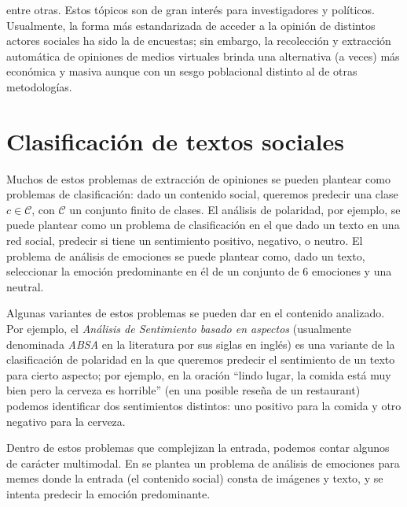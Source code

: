 entre otras. Estos tópicos son de gran interés para investigadores y políticos. Usualmente, la forma más estandarizada de acceder a la opinión de distintos actores sociales ha sido la de encuestas; sin embargo, la recolección y extracción automática de opiniones de medios virtuales brinda una alternativa (a veces) más económica y masiva aunque con un sesgo poblacional distinto al de otras metodologías.


\section{Clasificación de textos sociales}

Muchos de estos problemas de extracción de opiniones se pueden plantear como problemas de clasificación\cite{pang2008opinion}: dado un contenido social, queremos predecir una clase $c \in \mathcal{C}$, con $\mathcal{C}$ un conjunto finito de clases. El análisis de polaridad, por ejemplo, se puede plantear como un problema de clasificación en el que dado un texto en una red social, predecir si tiene un sentimiento positivo, negativo, o neutro. El problema de análisis de emociones se puede plantear como, dado un texto, seleccionar la emoción predominante en él de un conjunto de 6 emociones y una neutral.

Algunas variantes de estos problemas se pueden dar en el contenido analizado. Por ejemplo, el \emph{Análisis de Sentimiento basado en aspectos} (usualmente denominada \emph{ABSA} en la literatura por sus siglas en inglés) es una variante de la clasificación de polaridad en la que queremos predecir el sentimiento de un texto para cierto aspecto\cite{pavlopoulos2014aspect}; por ejemplo, en la oración ``lindo lugar, la comida está muy bien pero la cerveza es horrible'' (en una posible reseña de un restaurant) podemos identificar dos sentimientos distintos: uno positivo para la comida y otro negativo para la cerveza.

Dentro de estos problemas que complejizan la entrada, podemos contar algunos de carácter multimodal.  En \citet{sharma-etal-2020-semeval} se plantea un problema de análisis de emociones para memes donde la entrada (el contenido social) consta de imágenes y texto, y se intenta predecir la emoción predominante.

